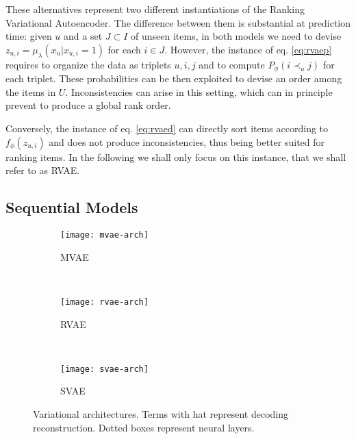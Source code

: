 \documentclass[sigconf]{acmart}
\newcommand{\bs}[1]{\ensuremath{\bm{\mathit{#1}}}}
\numberwithin{equation}{section}
\begin{document}
These alternatives represent two different instantiations of the
Ranking Variational Autoencoder. The
difference between them is substantial at prediction time: given $u$
and a set $J \subset I$ of unseen items, in both models we need to
devise $\bs{z}_{u,i} = \bs{\mu}_\lambda(\bs{x}_u | x_{u,i} = 1)$ for
each $i\in J$. However, the instance of eq. \ref{eq:rvaep} requires to
organize the data as triplets $u,i,j$  and to 
compute $P_\phi(i \prec_u j)$ for each triplet. These probabilities
can be then exploited to devise an order among the items in
$U$. Inconsistencies can arise in this setting, which can in principle
prevent to produce a global rank order. 

Conversely, the instance of eq. \ref{eq:rvaed} can
directly sort items according to $f_\phi(\bs{z}_{u,i})$ and does not
produce inconsistencies, thus being better suited for ranking
items. In the following we shall only focus on this 
instance, that we shall refer to as RVAE. 


\subsection{Sequential Models}\label{seq:sequential}



\begin{figure*}[th!]
 \centering
    \begin{subfigure}[t]{0.3\textwidth}
        \centering
          \texttt{[image: mvae-arch]}
        \caption{MVAE}
        \label{fig:mvae}
    \end{subfigure}
    ~ 
    \begin{subfigure}[t]{0.3\textwidth}
        \centering
          \texttt{[image: rvae-arch]}
        \caption{RVAE}
        \label{fig:rvae}
    \end{subfigure}
   ~ 
    \begin{subfigure}[t]{0.3\textwidth}
        \centering
          \texttt{[image: svae-arch]}
        \caption{SVAE}
        \label{fig:svae}
    \end{subfigure}
    \caption{Variational architectures. Terms with 
    hat represent decoding reconstruction. Dotted boxes represent neural
    layers. }
    \label{fig:architecture}
\end{figure*}
\end{document}
